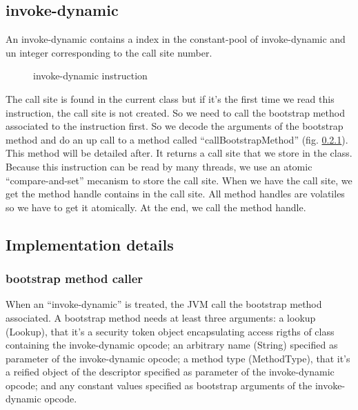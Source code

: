 \documentclass{sig-alternate}
\def \JVM{JVM\xspace}
\begin{document}
  \subsection{invoke-dynamic}

    An invoke-dynamic contains a index in the constant-pool of invoke-dynamic and un integer corresponding to the call site number.

    \begin{figure}[!h]
      \centering 
      \caption{invoke-dynamic instruction}
      \label{INDYins}
    \end{figure}

    The call site is found in the current class but if it's the first time we read this instruction, the call site is not created.
    So we need to call the bootstrap method associated to the instruction first.
    So we decode the arguments of the bootstrap method and do an up call to a method called ``callBootstrapMethod'' (fig. \ref{bsm}).
    This method will be detailed after.
    It returns a call site that we store in the class.
    Because this instruction can be read by many threads, we use an atomic ``compare-and-set'' mecanism to store the call site.
    When we have the call site, we get the method handle contains in the call site.
    All method handles are volatiles so we have to get it atomically.
    At the end, we call the method handle.

    \subsection{Implementation details}

      \subsubsection{bootstrap method caller}
        \label{bsm}

        When an ``invoke-dynamic'' is treated, the \JVM call the bootstrap method associated.%
        A bootstrap method needs at least three arguments:
        a lookup (Lookup), that it's a security token object encapsulating access rigths of class containing the invoke-dynamic opcode;
        an arbitrary name (String) specified as parameter of the invoke-dynamic opcode;
        a method type (MethodType), that it's a reified object of the descriptor specified as parameter of the invoke-dynamic opcode;
        and any constant values specified as bootstrap arguments of the invoke-dynamic opcode.
\end{document}
